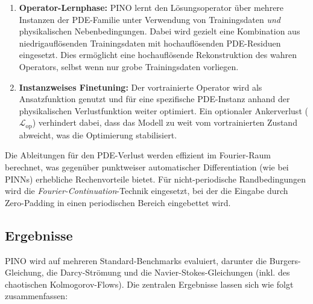 \documentclass[a4paper,12pt]{article}
\begin{document}
\begin{enumerate}
    \item \textbf{Operator-Lernphase:} PINO lernt den Lösungsoperator über mehrere
    Instanzen der PDE-Familie unter Verwendung von Trainingsdaten \emph{und}
    physikalischen Nebenbedingungen. Dabei wird gezielt eine Kombination aus
    niedrigauflösenden Trainingsdaten mit hochauflösenden PDE-Residuen eingesetzt.
    Dies ermöglicht eine hochauflösende Rekonstruktion des wahren Operators, selbst
    wenn nur grobe Trainingsdaten vorliegen.

    \item \textbf{Instanzweises Finetuning:} Der vortrainierte Operator wird als
    Ansatzfunktion genutzt und für eine spezifische PDE-Instanz anhand der
    physikalischen Verlustfunktion weiter optimiert. Ein optionaler Ankerverlust
    ($\mathcal{L}_{\mathrm{op}}$) verhindert dabei, dass das Modell zu weit vom
    vortrainierten Zustand abweicht, was die Optimierung stabilisiert.
\end{enumerate}

Die Ableitungen für den PDE-Verlust werden effizient im Fourier-Raum berechnet, was
gegenüber punktweiser automatischer Differentiation (wie bei PINNs) erhebliche
Rechenvorteile bietet. Für nicht-periodische Randbedingungen wird die
\textit{Fourier-Continuation}-Technik eingesetzt, bei der die Eingabe durch Zero-Padding
in einen periodischen Bereich eingebettet wird.

\subsection*{Ergebnisse}

PINO wird auf mehreren Standard-Benchmarks evaluiert, darunter die Burgers-Gleichung,
die Darcy-Strömung und die Navier-Stokes-Gleichungen (inkl. des chaotischen
Kolmogorov-Flows). Die zentralen Ergebnisse lassen sich wie folgt zusammenfassen:
\end{document}
